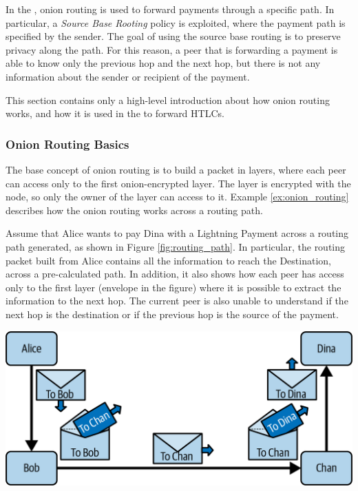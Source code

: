 In the {\LN}, onion routing is used to forward payments through a specific path.
In particular, a \emph{Source Base Rooting} policy is exploited, where the payment path is specified by the sender.
The goal of using the source base routing is to preserve privacy along the path. For this reason, a peer that
is forwarding a payment is able to know only the previous hop and the next hop, but there is not any information
about the sender or recipient of the payment.

This section contains only a high-level introduction about how onion routing works, and how it is used in the {\LN} to forward HTLCs.

\subsubsection{Onion Routing Basics}

The base concept of onion routing is to build a packet in layers, where each peer can access only to the
first onion-encrypted layer. The layer is encrypted with the node, so only the owner of the layer can access to it.
Example \ref{ex:onion_routing} describes how the onion routing works across a routing path.

\begin{example}
  \label{ex:onion_routing}
  Assume that Alice wants to pay Dina with a Lightning Payment across a routing path generated, as shown in Figure \ref{fig:routing_path}.
  In particular, the routing packet built from Alice contains all the
  information to reach the Destination, across a pre-calculated path.
  In addition, it also shows how each peer has access only to the first layer (envelope in the figure) where it is possible to extract the information to the next hop.
  The current peer is also unable to understand if the next hop is the destination or if the previous hop is the source of the payment.

  {\centering
    \includegraphics[width=0.6\columnwidth]{imgs/mtln_1007.png}
    \par}
\end{example}

